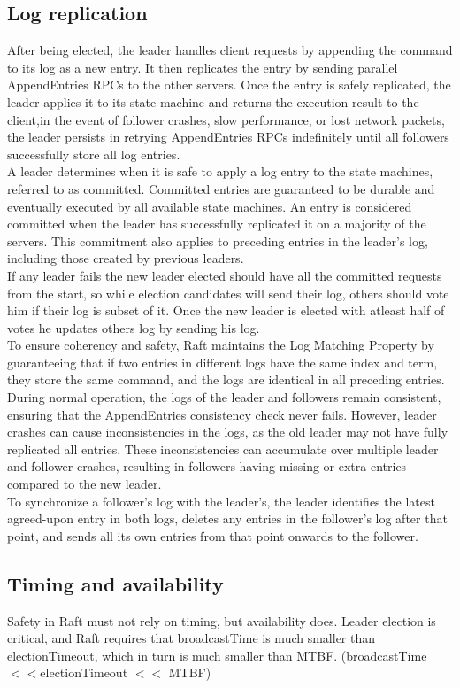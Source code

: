 \documentclass{article}
\begin{document}
\subsection{Log replication}
After being elected, the leader handles client requests by appending the command to its log as a new entry. It then replicates the entry by sending parallel AppendEntries RPCs to the other servers. Once the entry is safely replicated, the leader applies it to its state machine and returns the execution result to the client,in the event of follower crashes, slow performance, or lost network packets, the leader persists in retrying AppendEntries RPCs indefinitely until all followers successfully store all log entries. \\
A leader determines when it is safe to apply a log entry to the state machines, referred to as committed. Committed entries are guaranteed to be durable and eventually executed by all available state machines. An entry is considered committed when the leader has successfully replicated it on a majority of the servers. This commitment also applies to preceding entries in the leader's log, including those created by previous leaders.\\
If any leader fails the new leader elected should have all the committed requests from the start, so while election candidates will send their log, others should vote him if their log is subset of it. Once the new leader is elected with atleast half of votes he updates others log by sending his log. \\
To ensure coherency and safety, Raft maintains the Log Matching Property by guaranteeing that if two entries in different logs have the same index and term, they store the same command, and the logs are identical in all preceding entries. \\
During normal operation, the logs of the leader and followers remain consistent, ensuring that the AppendEntries consistency check never fails. However, leader crashes can cause inconsistencies in the logs, as the old leader may not have fully replicated all entries. These inconsistencies can accumulate over multiple leader and follower crashes, resulting in followers having missing or extra entries compared to the new leader.\\
To synchronize a follower's log with the leader's, the leader identifies the latest agreed-upon entry in both logs, deletes any entries in the follower's log after that point, and sends all its own entries from that point onwards to the follower. 
\subsection{Timing and availability}
Safety in Raft must not rely on timing, but availability does. Leader election is critical, and Raft requires that broadcastTime is much smaller than electionTimeout, which in turn is much smaller than MTBF. (broadcastTime $<< $electionTimeout $<<$ MTBF)
\end{document}
